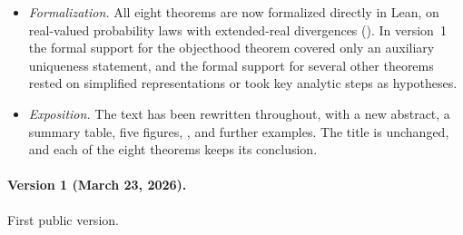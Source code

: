 \begin{itemize}[leftmargin=*]
  \item \emph{Formalization.} All eight theorems are now formalized directly in Lean, on real-valued probability laws with extended-real divergences (). In version~1 the formal support for the objecthood theorem covered only an auxiliary uniqueness statement, and the formal support for several other theorems rested on simplified representations or took key analytic steps as hypotheses.
  \item \emph{Exposition.} The text has been rewritten throughout, with a new abstract, a summary table, five figures, , and further examples. The title is unchanged, and each of the eight theorems keeps its conclusion.
\end{itemize}

\paragraph{Version 1 (March 23, 2026).}
First public version.
